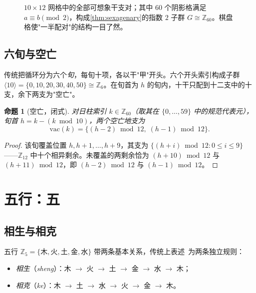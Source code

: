 \documentclass[11pt,a4paper,fontset=none]{ctexart}
\newtheorem{proposition}[theorem]{命题}
\theoremstyle{definition}
\theoremstyle{remark}
\newcommand{\Z}{\mathbb{Z}}
\begin{document}
\begin{figure}[h]\centering
{}
\caption{$10\times12$ 网格中的全部可想象干支对；其中 $60$ 个阴影格满足 $a\equiv b\pmod 2$，构成\cref{thm:sexagenary}的指数 $2$ 子群 $G\cong\Z_{60}$。棋盘格使"一半配对"的结构一目了然。}\label{fig:grid}
\end{figure}

\subsection{六旬与空亡}
传统把循环分为六个\emph{旬}，每旬十项，各以干"甲"开头。六个开头索引构成子群 $\langle 10\rangle=\{0,10,20,30,40,50\}\cong\Z_6$。在旬首为 $h$ 的旬内，十干只配到十二支中的十支，余下两支为"空亡"。

\begin{proposition}[空亡，闭式]\label{prop:vacancy}
对日柱索引 $k\in\Z_{60}$（取其在 $\{0,\dots,59\}$ 中的规范代表元），旬首 $h=k-(k\bmod 10)$，两个空亡地支为
\[
\mathrm{vac}(k)=\{(h-2)\bmod 12,\;(h-1)\bmod 12\}.
\]
\end{proposition}
\begin{proof}
该旬覆盖位置 $h,h+1,\dots,h+9$，其支为 $\{(h+i)\bmod 12:0\le i\le 9\}$——$\Z_{12}$ 中十个相异剩余。未覆盖的两剩余恰为 $(h+10)\bmod 12$ 与 $(h+11)\bmod 12$，即 $(h-2)\bmod 12$ 与 $(h-1)\bmod 12$。
\end{proof}

\section{五行：五}\label{sec:wuxing}

\subsection{相生与相克}
五行 $\Z_5=\{\text{木},\text{火},\text{土},\text{金},\text{水}\}$ 带两条基本关系，传统上表述~\cite{hongfan}为两条独立规则：
\begin{itemize}[leftmargin=*]
\item \emph{相生}（\emph{sheng}）：木 $\to$ 火 $\to$ 土 $\to$ 金 $\to$ 水 $\to$ 木；
\item \emph{相克}（\emph{ke}）：木 $\to$ 土 $\to$ 水 $\to$ 火 $\to$ 金 $\to$ 木。
\end{itemize}
\end{document}
